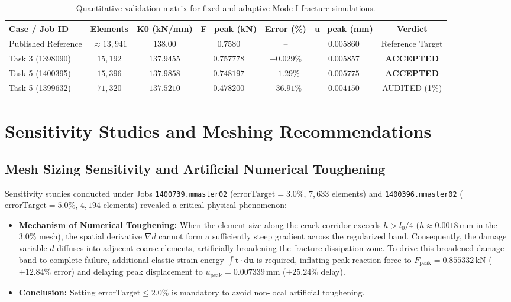 \documentclass[11pt,a4paper]{report}
\begin{document}
\begin{table}[htbp]
\centering
\small
\caption{Quantitative validation matrix for fixed and adaptive Mode-I fracture simulations.}
\label{tab:validation_matrix}
\begin{tabular}{lcccccc}
\toprule
\textbf{Case / Job ID} & \textbf{Elements} & \textbf{K0 (kN/mm)} & \textbf{F\_peak (kN)} & \textbf{Error (\%)} & \textbf{u\_peak (mm)} & \textbf{Verdict} \\
\midrule
Published Reference & $\approx 13{,}941$ & $138.00$ & $0.7580$ & -- & $0.005860$ & Reference Target \\
Task 3 (1398090) & $15{,}192$ & $137.9455$ & $0.757778$ & $-0.029\%$ & $0.005857$ & \textbf{ACCEPTED} \\
Task 5 (1400395) & $15{,}396$ & $137.9858$ & $0.748197$ & $-1.29\%$ & $0.005775$ & \textbf{ACCEPTED} \\
Task 5 (1399632) & $71{,}320$ & $137.5210$ & $0.478200$ & $-36.91\%$ & $0.004150$ & AUDITED (1\%) \\
\bottomrule
\end{tabular}
\end{table}

\chapter{Sensitivity Studies and Meshing Recommendations}
\label{chap:sensitivity}

\section{Mesh Sizing Sensitivity and Artificial Numerical Toughening}
\label{sec:sens_mesh}
Sensitivity studies conducted under Jobs \texttt{1400739.mmaster02} ($\text{errorTarget}=3.0\%$, $7{,}633$ elements) and \texttt{1400396.mmaster02} ($\text{errorTarget}=5.0\%$, $4{,}194$ elements) revealed a critical physical phenomenon:
\begin{itemize}
    \item \textbf{Mechanism of Numerical Toughening:} When the element size along the crack corridor exceeds $h > l_0 / 4$ ($h \approx 0.0018\,\mathrm{mm}$ in the $3.0\%$ mesh), the spatial derivative $\nabla d$ cannot form a sufficiently steep gradient across the regularized band. Consequently, the damage variable $d$ diffuses into adjacent coarse elements, artificially broadening the fracture dissipation zone. To drive this broadened damage band to complete failure, additional elastic strain energy $\int \mathbf{t} \cdot \mathrm{d}\mathbf{u}$ is required, inflating peak reaction force to $F_{\text{peak}} = 0.855332\,\mathrm{kN}$ ($+12.84\%$ error) and delaying peak displacement to $u_{\text{peak}} = 0.007339\,\mathrm{mm}$ ($+25.24\%$ delay).
    \item \textbf{Conclusion:} Setting $\text{errorTarget} \le 2.0\%$ is mandatory to avoid non-local artificial toughening.
\end{itemize}
\end{document}
